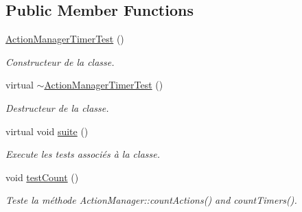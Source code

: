 \subsection*{Public Member Functions}
\begin{DoxyCompactItemize}
\item 
\mbox{\label{classtest_1_1ActionManagerTimerTest_ad50564ab29c9a5344a4f7b65eb47df1d}} 
\hyperlink{classtest_1_1ActionManagerTimerTest_ad50564ab29c9a5344a4f7b65eb47df1d}{Action\+Manager\+Timer\+Test} ()
\begin{DoxyCompactList}\small\item\em Constructeur de la classe. \end{DoxyCompactList}\item 
\mbox{\label{classtest_1_1ActionManagerTimerTest_a9e3b1ce8000307eb8e0b5d9bc3355640}} 
virtual \hyperlink{classtest_1_1ActionManagerTimerTest_a9e3b1ce8000307eb8e0b5d9bc3355640}{$\sim$\+Action\+Manager\+Timer\+Test} ()
\begin{DoxyCompactList}\small\item\em Destructeur de la classe. \end{DoxyCompactList}\item 
\mbox{\label{classtest_1_1ActionManagerTimerTest_a8ccca601efedee60309749220611fd3a}} 
virtual void \hyperlink{classtest_1_1ActionManagerTimerTest_a8ccca601efedee60309749220611fd3a}{suite} ()
\begin{DoxyCompactList}\small\item\em Execute les tests associés à la classe. \end{DoxyCompactList}\item 
\mbox{\label{classtest_1_1ActionManagerTimerTest_a1dd64decf53a02d8991cc0f5321b709d}} 
void \hyperlink{classtest_1_1ActionManagerTimerTest_a1dd64decf53a02d8991cc0f5321b709d}{test\+Count} ()
\begin{DoxyCompactList}\small\item\em Teste la méthode Action\+Manager\+::count\+Actions() and count\+Timers(). \end{DoxyCompactList}\item 
\mbox{\label{classtest_1_1ActionManagerTimerTest_a9aa26ddccf376e814314a0671f50af0b}} 

\end{DoxyCompactItemize}
